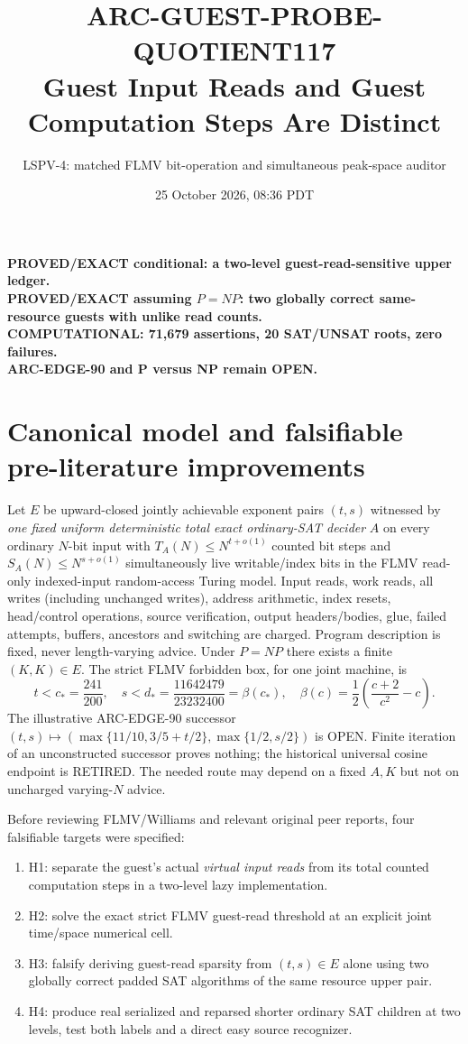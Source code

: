 \documentclass[11pt]{article}
\title{ARC-GUEST-PROBE-QUOTIENT117\\ \large Guest Input Reads and Guest Computation Steps Are Distinct}
\author{LSPV-4: matched FLMV bit-operation and simultaneous peak-space auditor}
\date{25 October 2026, 08:36 PDT}
\begin{document}
\maketitle
\begin{center}\textbf{PROVED/EXACT conditional: a two-level guest-read-sensitive upper ledger.}\\
\textbf{PROVED/EXACT assuming $P=NP$: two globally correct same-resource guests with unlike read counts.}\\
\textbf{COMPUTATIONAL: 71,679 assertions, 20 SAT/UNSAT roots, zero failures.}\\
\textbf{ARC-EDGE-90 and P versus NP remain OPEN.}\end{center}

\section{Canonical model and falsifiable pre-literature improvements}
Let $E$ be upward-closed jointly achievable exponent pairs $(t,s)$ witnessed by
\emph{one fixed uniform deterministic total exact ordinary-SAT decider} $A$
on every ordinary $N$-bit input with $T_A(N)\le N^{t+o(1)}$ counted bit steps
and $S_A(N)\le N^{s+o(1)}$ simultaneously live writable/index bits in the
FLMV read-only indexed-input random-access Turing model. Input reads,
work reads, all writes (including unchanged writes), address arithmetic,
index resets, head/control operations, source verification, output
headers/bodies, glue, failed attempts, buffers, ancestors and switching
are charged. Program description is fixed, never length-varying advice.
Under $P=NP$ there exists a finite $(K,K)\in E$. The strict FLMV
forbidden box, for one joint machine, is
\[
t<c_*=\frac{241}{200},\quad
s<d_*=\frac{11642479}{23232400}=\beta(c_*),\quad
\beta(c)=\frac12\left(\frac{c+2}{c^2}-c\right).
\]
The illustrative ARC-EDGE-90 successor
$(t,s)\mapsto(\max\{11/10,3/5+t/2\},\max\{1/2,s/2\})$
is OPEN. Finite iteration of an unconstructed successor proves nothing;
the historical universal cosine endpoint is RETIRED.
The needed route may depend on a fixed $A,K$ but not on uncharged
varying-$N$ advice.

Before reviewing FLMV/Williams and relevant original peer reports, four
falsifiable targets were specified:
\begin{enumerate}
\item[] H1: separate the guest's actual \emph{virtual input reads} from its total counted computation steps in a two-level lazy implementation.
\item[] H2: solve the exact strict FLMV guest-read threshold at an explicit joint time/space numerical cell.
\item[] H3: falsify deriving guest-read sparsity from $(t,s)\in E$ alone using two globally correct padded SAT algorithms of the same resource upper pair.
\item[] H4: produce real serialized and reparsed shorter ordinary SAT children at two levels, test both labels and a direct easy source recognizer.
\end{enumerate}
\end{document}
